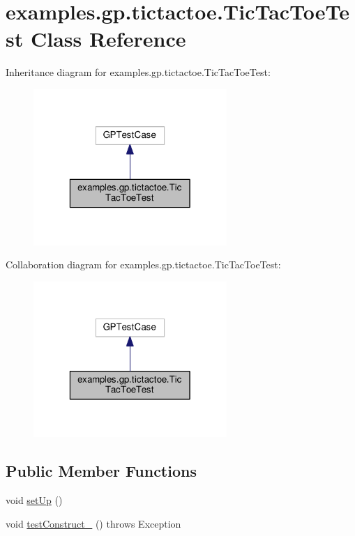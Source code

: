 \hypertarget{classexamples_1_1gp_1_1tictactoe_1_1_tic_tac_toe_test}{\section{examples.\-gp.\-tictactoe.\-Tic\-Tac\-Toe\-Test Class Reference}
\label{classexamples_1_1gp_1_1tictactoe_1_1_tic_tac_toe_test}
}


Inheritance diagram for examples.\-gp.\-tictactoe.\-Tic\-Tac\-Toe\-Test\-:
\nopagebreak
\begin{figure}[H]
\begin{center}
\leavevmode
\includegraphics[width=208pt]{classexamples_1_1gp_1_1tictactoe_1_1_tic_tac_toe_test__inherit__graph}
\end{center}
\end{figure}


Collaboration diagram for examples.\-gp.\-tictactoe.\-Tic\-Tac\-Toe\-Test\-:
\nopagebreak
\begin{figure}[H]
\begin{center}
\leavevmode
\includegraphics[width=208pt]{classexamples_1_1gp_1_1tictactoe_1_1_tic_tac_toe_test__coll__graph}
\end{center}
\end{figure}
\subsection*{Public Member Functions}
\begin{DoxyCompactItemize}
\item 
void \hyperlink{classexamples_1_1gp_1_1tictactoe_1_1_tic_tac_toe_test_a8761f615e3a5bc3c718445955601382a}{set\-Up} ()
\item 
void \hyperlink{classexamples_1_1gp_1_1tictactoe_1_1_tic_tac_toe_test_a09b868842d0581525370cb2ea7ec2569}{test\-Construct\-\_} ()  throws Exception 
\end{DoxyCompactItemize}
